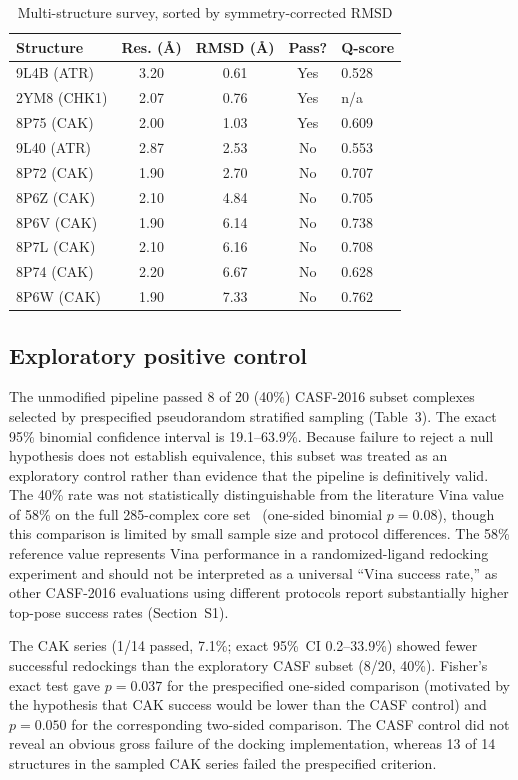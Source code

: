 \documentclass[global,twocolumn]{svjour}
\newcommand{\st}{\footnotesize\setlength{\tabcolsep}{3pt}}
\begin{document}
\begin{table}[t]
\centering
\caption{Multi-structure survey, sorted by symmetry-corrected RMSD}
\label{tab:survey}
\st
\begin{tabular}{lcccl}
\toprule
Structure & Res. (\AA{}) & RMSD (\AA{}) & Pass? & Q-score \\
\midrule
9L4B (ATR)  & 3.20 & 0.61 & Yes & 0.528 \\
2YM8 (CHK1) & 2.07 & 0.76 & Yes & n/a \\
8P75 (CAK)  & 2.00 & 1.03 & Yes & 0.609 \\
9L40 (ATR)  & 2.87 & 2.53 & No  & 0.553 \\
8P72 (CAK)  & 1.90 & 2.70 & No  & 0.707 \\
8P6Z (CAK)  & 2.10 & 4.84 & No  & 0.705 \\
8P6V (CAK)  & 1.90 & 6.14 & No  & 0.738 \\
8P7L (CAK)  & 2.10 & 6.16 & No  & 0.708 \\
8P74 (CAK)  & 2.20 & 6.67 & No  & 0.628 \\
8P6W (CAK)  & 1.90 & 7.33 & No  & 0.762 \\
\bottomrule
\end{tabular}
\end{table}

\subsection{Exploratory positive control}

The unmodified pipeline passed 8 of 20 (40\%) CASF-2016 subset complexes
selected by prespecified pseudorandom stratified sampling (Table~3). The exact
95\% binomial confidence interval is 19.1--63.9\%. Because failure to reject a
null hypothesis does not establish equivalence, this subset was treated as an
exploratory control rather than evidence that the pipeline is definitively
valid. The 40\% rate was not statistically distinguishable from the literature
Vina value of 58\% on the full 285-complex core set~\cite{zhang2023} (one-sided
binomial $p=0.08$), though this comparison is limited by small sample size and
protocol differences. The 58\% reference value represents Vina performance in a
randomized-ligand redocking experiment and should not be interpreted as a
universal ``Vina success rate,'' as other CASF-2016 evaluations using different
protocols report substantially higher top-pose success rates (Section~S1).

The CAK series (1/14 passed, 7.1\%; exact 95\%~CI 0.2--33.9\%) showed fewer
successful redockings than the exploratory CASF subset (8/20, 40\%). Fisher's
exact test gave $p=0.037$ for the prespecified one-sided comparison (motivated
by the hypothesis that CAK success would be lower than the CASF control) and
$p=0.050$ for the corresponding two-sided comparison. The CASF control did not
reveal an obvious gross failure of the docking implementation, whereas 13 of
14 structures in the sampled CAK series failed the prespecified criterion.
\end{document}
